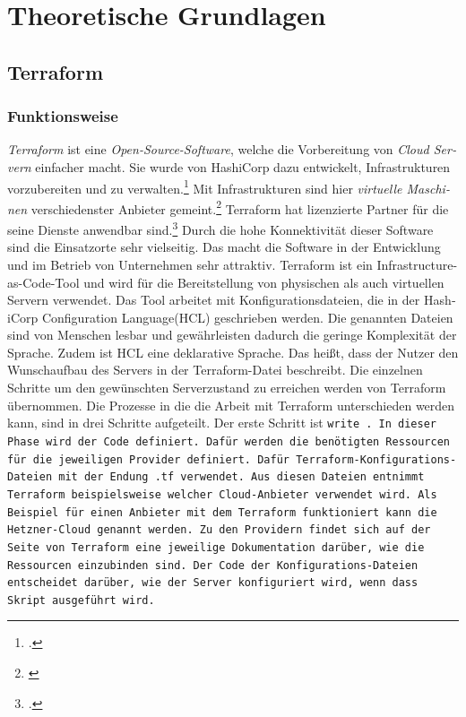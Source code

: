 \section{Theoretische Grundlagen} 
\subsection{Terraform}
\begin{otherlanguage}{ngerman}
\subsubsection{Funktionsweise}
\textit{Terraform} ist eine \textit{Open-Source-Software}, welche die Vorbereitung von \textit{Cloud Servern} einfacher macht. Sie wurde von HashiCorp dazu entwickelt, Infrastrukturen vorzubereiten und zu verwalten.\footcite{introform} Mit Infrastrukturen sind hier \textit{virtuelle Maschinen} verschiedenster Anbieter gemeint.\footnote{\cite{Terraform}} Terraform hat lizenzierte Partner für die seine Dienste anwendbar sind.\footcite{TerraProviders} Durch die hohe Konnektivität dieser Software sind die Einsatzorte sehr vielseitig. Das macht die Software in der Entwicklung und im Betrieb von Unternehmen sehr attraktiv. 
\newline
\newline
Terraform ist ein Infrastructure-as-Code-Tool und wird für die Bereitstellung von physischen als auch virtuellen Servern verwendet. Das Tool arbeitet mit Konfigurationsdateien, die in der HashiCorp Configuration Language(HCL) geschrieben werden. Die genannten Dateien sind von Menschen lesbar und gewährleisten dadurch die geringe Komplexität der Sprache. Zudem ist HCL eine deklarative Sprache. Das heißt, dass der Nutzer den Wunschaufbau des Servers in der Terraform-Datei beschreibt. Die einzelnen Schritte um den gewünschten Serverzustand zu erreichen werden von Terraform übernommen. 
\newline
Die Prozesse in die die Arbeit mit Terraform unterschieden werden kann, sind in drei Schritte aufgeteilt. Der erste Schritt ist \tt write \rm. In dieser Phase wird der Code definiert. Dafür werden die benötigten Ressourcen für die jeweiligen Provider definiert. Dafür Terraform-Konfigurations-Dateien mit der Endung \tt .tf \rm verwendet. Aus diesen Dateien entnimmt Terraform beispielsweise welcher Cloud-Anbieter verwendet wird. Als Beispiel für einen Anbieter mit dem Terraform funktioniert kann die \dq Hetzner-Cloud \dq{} genannt werden. Zu den Providern findet sich auf der Seite von Terraform eine jeweilige Dokumentation darüber, wie die Ressourcen einzubinden sind. Der Code der Konfigurations-Dateien entscheidet darüber, wie der Server konfiguriert wird, wenn dass Skript ausgeführt wird. 

\end{otherlanguage}
